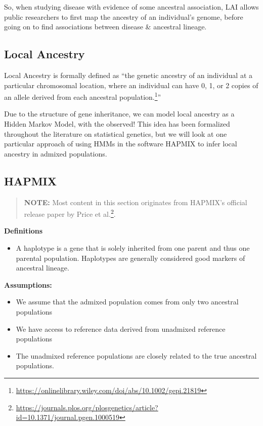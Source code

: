 \documentclass[
]{book}
\providecommand{\tightlist}{%
  \setlength{\itemsep}{0pt}\setlength{\parskip}{0pt}}
\begin{document}
So, when studying disease with evidence of some ancestral association, LAI allows public researchers to first map the ancestry of an individual's genome, before going on to find associations between disease \& ancestral lineage.

\hypertarget{local-ancestry}{%
\subsection*{Local Ancestry}\label{local-ancestry}}

Local Ancestry is formally defined as ``the genetic ancestry of an individual at a particular chromosomal location, where an individual can have 0, 1, or 2 copies of an allele derived from each ancestral population.\footnote{\url{https://onlinelibrary.wiley.com/doi/abs/10.1002/gepi.21819}}''

Due to the structure of gene inheritance, we can model local ancestry as a Hidden Markov Model, with the observed! This idea has been formalized throughout the literature on statistical genetics, but we will look at one particular approach of using HMMs in the software HAPMIX to infer local ancestry in admixed populations.

\hypertarget{hapmix}{%
\subsection*{HAPMIX}\label{hapmix}}

\begin{quote}
\textbf{NOTE:} Most content in this section originates from HAPMIX's official release paper by Price et al.\footnote{\url{https://journals.plos.org/plosgenetics/article?id=10.1371/journal.pgen.1000519}}.
\end{quote}

\textbf{Definitions}

\begin{itemize}
\tightlist
\item
  A haplotype is a gene that is solely inherited from one parent and thus one parental population. Haplotypes are generally considered good markers of ancestral lineage.
\end{itemize}

\textbf{Assumptions:}

\begin{itemize}
\tightlist
\item
  We assume that the admixed population comes from only two ancestral populations
\item
  We have access to reference data derived from unadmixed reference populations
\item
  The unadmixed reference populations are closely related to the true ancestral populations.
\end{itemize}
\end{document}

